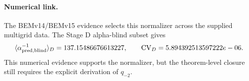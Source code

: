 \paragraph{Numerical link.}
The BEMv14/BEMv15 evidence selects this normalizer across the supplied
multigrid data.  The Stage D alpha-blind subset gives
\[
\langle\alpha^{-1}_{\rm pred,blind}\rangle_D=137.15486676613227,
\qquad
{\rm CV}_D=5.894392513597222e-06.
\]
This numerical evidence supports the normalizer, but the theorem-level closure
still requires the explicit derivation of \(q_{-2}\).
